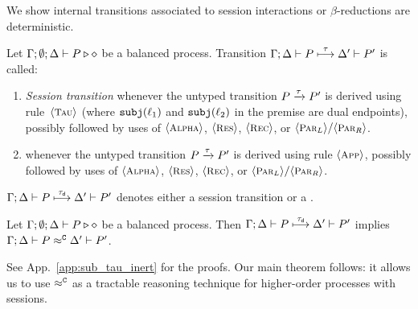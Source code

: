 We show internal transitions associated to session interactions or  
$\beta$-reductions are deterministic.  
		
\begin{definition}\myrm
\label{def:dettrans}
	Let  $\Gamma; \emptyset; \Delta \vdash P \triangleright \diamond$ be a balanced \HOp process. 
	Transition $\Gamma; \Delta \vdash P \stackrel{\tau}{\longmapsto} \Delta' \vdash P'$ is called:
\vspace{-2mm}
	\begin{enumerate}[$-$]
		\item {\em Session transition} whenever the untyped transition $P \xrightarrow{\tau} P'$ 
		is derived using 
			rule~$\ltsrule{Tau}$ 
		(where $\mathtt{subj}(\ell_1)$ and $\mathtt{subj}(\ell_2)$ in the premise 
		are dual endpoints), 
		possibly followed by uses of  $\ltsrule{Alpha}$, $\ltsrule{Res}$, $\ltsrule{Rec}$, or $\ltsrule{Par${}_L$}/
		\ltsrule{Par${}_R$}$.
		
		\item	{\em \betatran}	whenever the untyped transition $P \xrightarrow{\tau} P'$
			is derived using rule $\ltsrule{App}$,
			possibly followed by uses of  $\ltsrule{Alpha}$, $\ltsrule{Res}$, $\ltsrule{Rec}$, or $\ltsrule{Par${}_L$}/
		\ltsrule{Par${}_R$}$.
	\end{enumerate}
%
	 $\Gamma; \Delta \vdash P \stackrel{\tau_{\mathsf{d}}}{\longmapsto} \Delta' \vdash P'$ denotes
	either a session transition or a \betatran.
\end{definition}

\begin{proposition}\myrm
	\label{lem:tau_inert}
Let  $\Gamma; \emptyset; \Delta \vdash P \triangleright \diamond$ be a balanced \HOp process.
	Then
$\Gamma; \Delta \vdash P \stackrel{\tau_{\mathsf{d}}}{\longmapsto} \Delta' \vdash P'$ implies
			$\Gamma; \Delta \vdash P \approx^\mathtt{C} \Delta' \vdash P'$.
\end{proposition}
\noi 
See App.~\ref{app:sub_tau_inert} for the proofs. 
Our main theorem follows: %
it allows us to use $\approx^\mathtt{C}$ as a tractable reasoning %
technique for higher-order processes with sessions.

